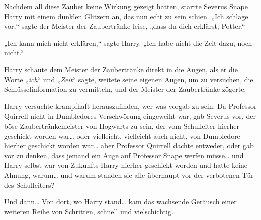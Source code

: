Nachdem all diese Zauber keine Wirkung gezeigt hatten, starrte Severus Snape Harry mit einem dunklen Glitzern an, das nun echt zu sein schien.
„Ich schlage vor,“ sagte der Meister der Zaubertränke leise, „dass du dich erklärst, Potter.“

„Ich kann mich nicht erklären,“ sagte Harry. „Ich habe nicht die Zeit dazu, noch nicht.“

Harry schaute dem Meister der Zaubertränke direkt in die Augen, als er die Worte „\emph{ich}“ und „\emph{Zeit}“ sagte, weitete seine eigenen Augen, um zu versuchen, die Schlüsselinformation zu vermitteln, und der Meister der Zaubertränke zögerte.

Harry versuchte krampfhaft herauszufinden, wer was vorgab zu sein. Da Professor Quirrell nicht in Dumbledores Verschwörung eingeweiht war, gab Severus vor, der böse Zaubertränkemeister von Hogwarts zu sein, der vom Schulleiter hierher geschickt worden war… oder vielleicht, vielleicht auch nicht, von Dumbledore hierher geschickt worden war… aber Professor Quirrell dachte entweder, oder gab vor zu denken, dass jemand ein Auge auf Professor Snape werfen müsse… und Harry selbst war von Zukunfts-Harry hierher geschickt worden und hatte keine Ahnung, warum… und warum standen sie alle überhaupt vor der verbotenen Tür des Schulleiters?



Und dann… Von dort, wo Harry stand… kam das wachsende Geräusch einer weiteren Reihe von Schritten, schnell und vielschichtig.

